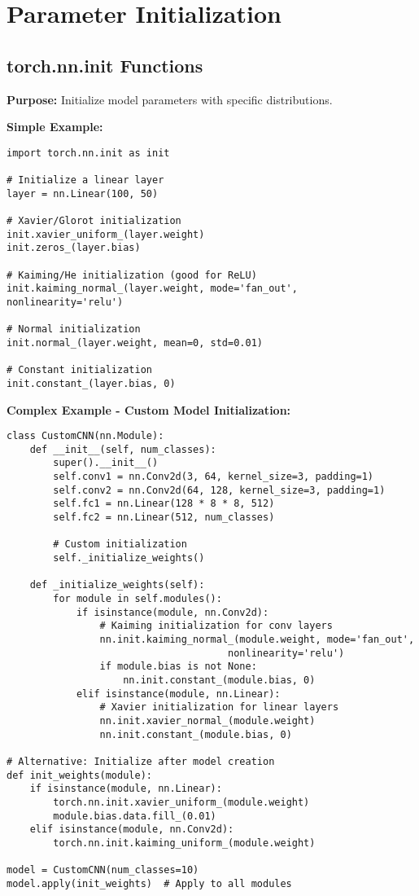 \documentclass[11pt,a4paper]{book}
\begin{document}
\section{Parameter Initialization}

\subsection{torch.nn.init Functions}

\textbf{Purpose:} Initialize model parameters with specific distributions.

\textbf{Simple Example:}
\begin{verbatim}
import torch.nn.init as init

# Initialize a linear layer
layer = nn.Linear(100, 50)

# Xavier/Glorot initialization
init.xavier_uniform_(layer.weight)
init.zeros_(layer.bias)

# Kaiming/He initialization (good for ReLU)
init.kaiming_normal_(layer.weight, mode='fan_out', nonlinearity='relu')

# Normal initialization
init.normal_(layer.weight, mean=0, std=0.01)

# Constant initialization
init.constant_(layer.bias, 0)
\end{verbatim}

\textbf{Complex Example - Custom Model Initialization:}
\begin{verbatim}
class CustomCNN(nn.Module):
    def __init__(self, num_classes):
        super().__init__()
        self.conv1 = nn.Conv2d(3, 64, kernel_size=3, padding=1)
        self.conv2 = nn.Conv2d(64, 128, kernel_size=3, padding=1)
        self.fc1 = nn.Linear(128 * 8 * 8, 512)
        self.fc2 = nn.Linear(512, num_classes)
        
        # Custom initialization
        self._initialize_weights()
    
    def _initialize_weights(self):
        for module in self.modules():
            if isinstance(module, nn.Conv2d):
                # Kaiming initialization for conv layers
                nn.init.kaiming_normal_(module.weight, mode='fan_out', 
                                      nonlinearity='relu')
                if module.bias is not None:
                    nn.init.constant_(module.bias, 0)
            elif isinstance(module, nn.Linear):
                # Xavier initialization for linear layers
                nn.init.xavier_normal_(module.weight)
                nn.init.constant_(module.bias, 0)

# Alternative: Initialize after model creation
def init_weights(module):
    if isinstance(module, nn.Linear):
        torch.nn.init.xavier_uniform_(module.weight)
        module.bias.data.fill_(0.01)
    elif isinstance(module, nn.Conv2d):
        torch.nn.init.kaiming_uniform_(module.weight)

model = CustomCNN(num_classes=10)
model.apply(init_weights)  # Apply to all modules
\end{verbatim}
\end{document}
